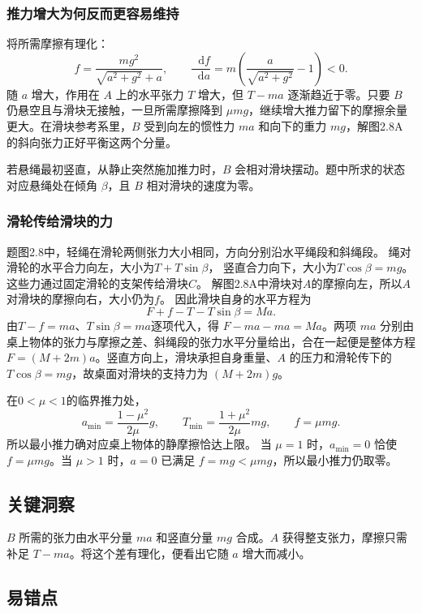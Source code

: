 \documentclass[UTF8,fontset=fandol,a4paper,11pt]{ctexart}
\newcommand{\dd}{\mathop{}\!\mathrm{d}}
\begin{document}
\subsubsection*{推力增大为何反而更容易维持}
将所需摩擦有理化：
\[
f=\frac{mg^2}{\sqrt{a^2+g^2}+a},\qquad
\frac{\dd f}{\dd a}=m\left(\frac a{\sqrt{a^2+g^2}}-1\right)<0.
\]
随 $a$ 增大，作用在 $A$ 上的水平张力 $T$ 增大，但 $T-ma$ 逐渐趋近于零。只要 $B$ 仍悬空且与滑块无接触，一旦所需摩擦降到 $\mu mg$，继续增大推力留下的摩擦余量更大。在滑块参考系里，$B$ 受到向左的惯性力 $ma$ 和向下的重力 $mg$，解图2.8A 的斜向张力正好平衡这两个分量。

若悬绳最初竖直，从静止突然施加推力时，$B$ 会相对滑块摆动。题中所求的状态对应悬绳处在倾角 $\beta$，且 $B$ 相对滑块的速度为零。
\subsubsection*{滑轮传给滑块的力}
题图2.8中，轻绳在滑轮两侧张力大小相同，方向分别沿水平绳段和斜绳段。
绳对滑轮的水平合力向左，大小为$T+T\sin\beta$，
竖直合力向下，大小为$T\cos\beta=mg$。
这些力通过固定滑轮的支架传给滑块$C$。
解图2.8A中滑块对$A$的摩擦向左，所以$A$对滑块的摩擦向右，大小仍为$f$。
因此滑块自身的水平方程为
\[
F+f-T-T\sin\beta=Ma.
\]
由$T-f=ma$、$T\sin\beta=ma$逐项代入，得
$F-ma-ma=Ma$。两项 $ma$ 分别由桌上物体的张力与摩擦之差、斜绳段的张力水平分量给出，合在一起便是整体方程 $F=(M+2m)a$。竖直方向上，滑块承担自身重量、$A$ 的压力和滑轮传下的 $T\cos\beta=mg$，故桌面对滑块的支持力为 $(M+2m)g$。

在$0<\mu<1$的临界推力处，
\[
a_{\min}=\frac{1-\mu^2}{2\mu}g,\qquad
T_{\min}=\frac{1+\mu^2}{2\mu}mg,\qquad f=\mu mg.
\]
所以最小推力确对应桌上物体的静摩擦恰达上限。
当 $\mu=1$ 时，$a_{\min}=0$ 恰使 $f=\mu mg$。当 $\mu>1$ 时，$a=0$ 已满足 $f=mg<\mu mg$，所以最小推力仍取零。




\subsection*{关键洞察}

$B$ 所需的张力由水平分量 $ma$ 和竖直分量 $mg$ 合成。$A$ 获得整支张力，摩擦只需补足 $T-ma$。将这个差有理化，便看出它随 $a$ 增大而减小。



\subsection*{易错点}
\end{document}
